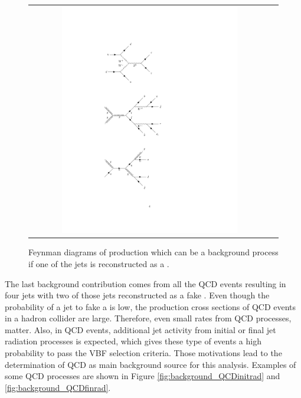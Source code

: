 \begin{figure}[tbh!]
	\centering
	\begin{tabular}{cc}
		\includegraphics[width=0.75\textwidth]{diagrams/pics/background_ttbar.pdf}
	\end{tabular}
	\caption{Feynman diagrams of \ttbar production which can be a background process if one of the jets is reconstructed as a \hadtau.}
	\label{fig:background_ttbar}
\end{figure}

The last background contribution comes from all the QCD events resulting in four jets with two of those jets reconstructed as a fake \hadtau. Even though the probability of a jet to fake a \hadtau is low, the production cross sections of QCD events in a hadron collider are large. Therefore, even small \hadtaufake rates from QCD processes, matter. Also, in QCD events, additional jet activity from initial or final jet radiation processes is expected, which gives these type of events a high probability to pass the VBF selection criteria. Those motivations lead to the determination of QCD as main background source for this analysis. Examples of some QCD processes are shown in Figure \ref{fig:background_QCDinitrad} and \ref{fig:background_QCDfinrad}.

